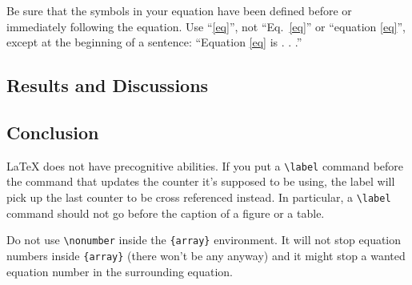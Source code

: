 \documentclass[conference]{IEEEtran}
\begin{document}
	Be sure that the 
	symbols in your equation have been defined before or immediately following 
	the equation. Use ``\eqref{eq}'', not ``Eq.~\eqref{eq}'' or ``equation \eqref{eq}'', except at 
	the beginning of a sentence: ``Equation \eqref{eq} is . . .''
	
	\subsection{Results and Discussions}
	
	
	\subsection{Conclusion}
	{\LaTeX} does not have precognitive abilities. If you put a
	\verb|\label| command before the command that updates the counter it's
	supposed to be using, the label will pick up the last counter to be
	cross referenced instead. In particular, a \verb|\label| command
	should not go before the caption of a figure or a table.
	
	Do not use \verb|\nonumber| inside the \verb|{array}| environment. It
	will not stop equation numbers inside \verb|{array}| (there won't be
	any anyway) and it might stop a wanted equation number in the
	surrounding equation. 
	
	
	
\end{document}
